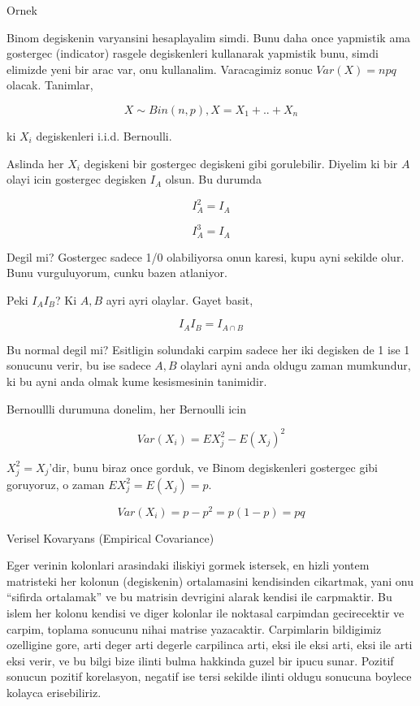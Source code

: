 \documentclass[12pt,fleqn]{article}\usepackage{../common}
\begin{document}
Ornek

Binom degiskenin varyansini hesaplayalim simdi. Bunu daha once yapmistik
ama gostergec (indicator) rasgele degiskenleri kullanarak yapmistik bunu,
simdi elimizde yeni bir arac var, onu kullanalim. Varacagimiz sonuc 
$Var(X) = npq$ olacak. Tanimlar,

$$ X \sim Bin(n,p), X = X_1+..+X_n $$

ki $X_i$ degiskenleri i.i.d. Bernoulli. 

Aslinda her $X_i$ degiskeni bir gostergec degiskeni gibi
gorulebilir. Diyelim ki bir $A$ olayi icin gostergec degisken $I_A$
olsun. Bu durumda

$$ I_A^2 = I_A $$

$$ I_A^3 = I_A $$

Degil mi? Gostergec sadece 1/0 olabiliyorsa onun karesi, kupu ayni sekilde
olur. Bunu vurguluyorum, cunku bazen atlaniyor. 

Peki $I_AI_B$? Ki $A,B$ ayri ayri olaylar. Gayet basit, 

$$ I_AI_B = I_{A \cap B} $$

Bu normal degil mi? Esitligin solundaki carpim sadece her iki degisken de 1
ise 1 sonucunu verir, bu ise sadece $A,B$ olaylari ayni anda oldugu zaman
mumkundur, ki bu ayni anda olmak kume kesismesinin tanimidir. 

Bernoullli durumuna donelim, her Bernoulli icin

$$ Var(X_i) = EX_j^2 - E(X_j)^2 $$

$X_j^2 = X_j$'dir, bunu biraz once gorduk, ve Binom degiskenleri gostergec
gibi goruyoruz, o zaman $EX_j^2 = E(X_j) = p$. 

$$ Var(X_i) = p - p^2 = p(1-p) = pq$$






















Verisel Kovaryans (Empirical Covariance) 

Eger verinin kolonlari arasindaki iliskiyi gormek istersek, en hizli yontem
matristeki her kolonun (degiskenin) ortalamasini kendisinden cikartmak,
yani onu ``sifirda ortalamak'' ve bu matrisin devrigini alarak kendisi ile
carpmaktir. Bu islem her kolonu kendisi ve diger kolonlar ile noktasal
carpimdan gecirecektir ve carpim, toplama sonucunu nihai matrise
yazacaktir. Carpimlarin bildigimiz ozelligine gore, arti deger arti degerle
carpilinca arti, eksi ile eksi arti, eksi ile arti eksi verir, ve bu bilgi
bize ilinti bulma hakkinda guzel bir ipucu sunar. Pozitif sonucun pozitif
korelasyon, negatif ise tersi sekilde ilinti oldugu sonucuna boylece
kolayca erisebiliriz.
\end{document}
